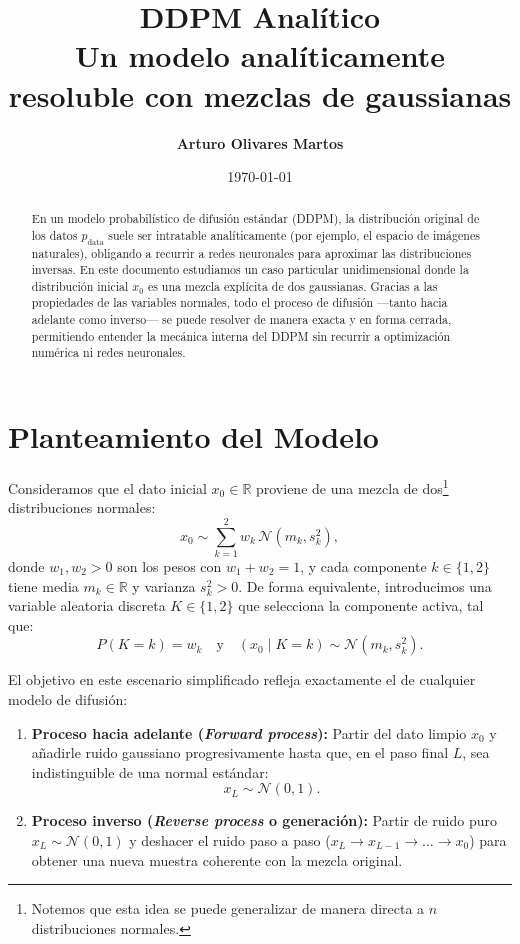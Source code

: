 \documentclass[11pt,a4paper]{article}
\title{\vspace{-1.5cm}\textbf{\Huge DDPM Analítico}\\[0.3em]
\Large Un modelo analíticamente resoluble con mezclas de gaussianas}
\author{\textbf{Arturo Olivares Martos}}
\date{\today}
\begin{document}
\maketitle

\begin{abstract}
En un modelo probabilístico de difusión estándar (DDPM), la distribución original de los datos $p_{\text{data}}$ suele ser intratable analíticamente (por ejemplo, el espacio de imágenes naturales), obligando a recurrir a redes neuronales para aproximar las distribuciones inversas. En este documento estudiamos un caso particular unidimensional donde la distribución inicial $x_0$ es una mezcla explícita de dos gaussianas. Gracias a las propiedades de las variables normales, todo el proceso de difusión —tanto hacia adelante como inverso— se puede resolver de manera exacta y en forma cerrada, permitiendo entender la mecánica interna del DDPM sin recurrir a optimización numérica ni redes neuronales.
\end{abstract}

\section{Planteamiento del Modelo}

Consideramos que el dato inicial $x_0 \in \mathbb{R}$ proviene de una mezcla de dos\footnote{Notemos que esta idea se puede generalizar de manera directa a $n$ distribuciones normales.} distribuciones normales:
\[
x_0 \sim \sum_{k=1}^{2} w_k\,\mathcal{N}\left(m_k, s_k^2\right),
\]
donde $w_1, w_2 > 0$ son los pesos con $w_1 + w_2 = 1$, y cada componente $k \in \{1, 2\}$ tiene media $m_k \in \mathbb{R}$ y varianza $s_k^2 > 0$. De forma equivalente, introducimos una variable aleatoria discreta $K \in \{1, 2\}$ que selecciona la componente activa, tal que:
\[
P(K = k) = w_k \quad \text{y} \quad (x_0 \mid K = k) \sim \mathcal{N}\left(m_k, s_k^2\right).
\]

El objetivo en este escenario simplificado refleja exactamente el de cualquier modelo de difusión:
\begin{enumerate}
    \item \textbf{Proceso hacia adelante (\textit{Forward process}):} Partir del dato limpio $x_0$ y añadirle ruido gaussiano progresivamente hasta que, en el paso final $L$, sea indistinguible de una normal estándar:
    \[
    x_L \sim \mathcal{N}(0, 1).
    \]
    
    \item \textbf{Proceso inverso (\textit{Reverse process} o generación):} Partir de ruido puro $x_L \sim \mathcal{N}(0, 1)$ y deshacer el ruido paso a paso ($x_L \to x_{L-1} \to \dots \to x_0$) para obtener una nueva muestra coherente con la mezcla original.
\end{enumerate}
\end{document}
